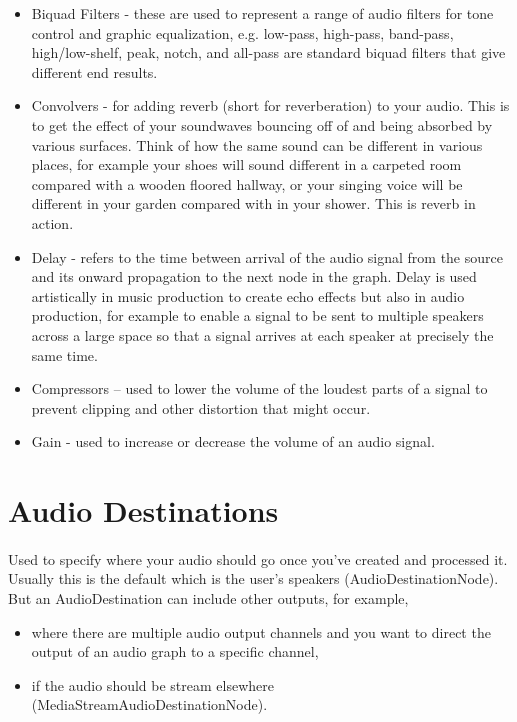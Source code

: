 \begin{itemize}
\item Biquad Filters - these are used to represent a range of audio filters for tone control and graphic equalization, e.g. low-pass, high-pass, band-pass, high/low-shelf, peak, notch, and all-pass are standard biquad filters that give different end results.
\item Convolvers - for adding reverb (short for reverberation) to your audio. This is to get the effect of your soundwaves bouncing off of and being absorbed by various surfaces. Think of how the same sound can be different in various places, for example your shoes will sound different in a carpeted room compared with a wooden floored hallway, or your singing voice will be different in your garden compared with in your shower. This is reverb in action.
\item Delay - refers to the time between arrival of the audio signal from the source and its onward propagation to the next node in the graph. Delay is used artistically in music production to create echo effects but also in audio production, for example to enable a signal to be sent to multiple speakers across a large space so that a signal arrives at each speaker at precisely the same time.
\item Compressors --  used to lower the volume of the loudest parts of a signal to prevent clipping and other distortion that might occur.
\item Gain - used to increase or decrease the volume of an audio signal.
\end{itemize}


\section{Audio Destinations}
\paragraph{} Used to specify where your audio should go once you’ve created and processed it. Usually this is the default which is the user’s speakers (AudioDestinationNode). But an AudioDestination can include other outputs, for example,

\begin{itemize}
\item where there are multiple audio output channels and you want to direct the output of an audio graph to a specific channel,
\item if the audio should be stream elsewhere (MediaStreamAudioDestinationNode).
\end{itemize}


